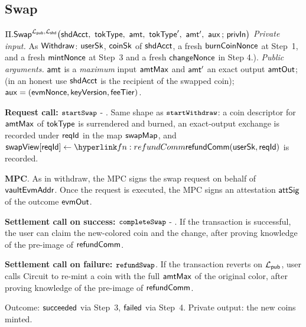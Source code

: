 

\subsection{Swap}
\label{ssec:swapinst2}

\begin{ProcBox}{$\Pi.\Swap^{\Lpub, \Lshd}\bigl(\shdAcct\bc \tokType\bc \amt\bc
    \tokTypeB\bc \amtB\bc \auxx \,;\, \privIn\bigr)$}
\sloppy
\emph{Private input.} As $\mathsf{Withdraw}$: $\mathsf{userSk}$, $\mathsf{coinSk}$ of $\mathsf{shdAcct}$, a fresh $\mathsf{burnCoinNonce}$ at
Step~1, and a fresh $\mathsf{mintNonce}$ at Step~3 and a fresh $\mathsf{changeNonce}$ in Step 4.).
\emph{Public arguments.} $\mathsf{amt}$ is a \emph{maximum} input $\mathsf{amtMax}$ and $\mathsf{amt}'$ an exact output
$\mathsf{amtOut}$; (in an honest use $\mathsf{shdAcct}$ is the recipient of the swapped coin);
$\mathsf{aux} = (\mathsf{evmNonce}, \mathsf{keyVersion}, \mathsf{feeTier})$.
\begin{Steps}
\item \textbf{Request call: $\texttt{\small startSwap}$} - . Same shape as $\texttt{\small startWithdraw}$: a   coin descriptor for $\mathsf{amtMax}$ of $\mathsf{tokType}$ is surrendered and burned, an exact-output exchange is
      recorded under $\mathsf{reqId}$ in the map $\mathsf{swapMap}$, and
      $\swapView[\rid] \gets \lnk{fn:refundComm}{\refundComm(\usersk, \rid)}$ is recorded.
\item \textbf{MPC}. As in withdraw,   the MPC signs the swap request on behalf of  $\mathsf{vaultEvmAddr}$. Once the request is executed,  the MPC signs an attestation $\mathsf{attSig}$ of the outcome $\mathsf{evmOut}$.
\item \textbf{Settlement call on success: $\texttt{\small completeSwap}$} - .
If the transaction is successful, the user can claim the new-colored coin and the change, after proving knowledge of the pre-image of $\mathsf{refundComm}$.

\item \textbf{Settlement call on failure: $\texttt{\small refundSwap}$}. If the transaction reverts on $\mathcal{L}_{\mathsf{pub}}$, user calls  Circuit  to re-mint a coin with the full $\mathsf{amtMax}$ of the original color, after proving  knowledge of the pre-image of $\mathsf{refundComm}$.
\end{Steps}

\medskip
Outcome: $\mathsf{succeeded}$ via Step~3, $\mathsf{failed}$ via Step~4.
Private output: the new coins minted.
\end{ProcBox}


